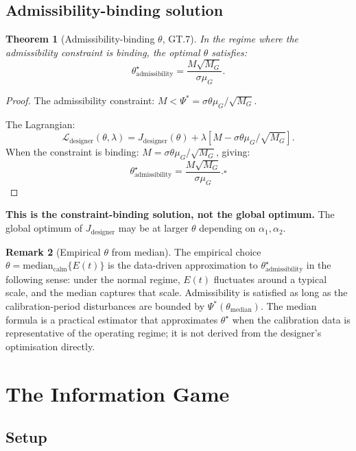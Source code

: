 \documentclass[11pt,a4paper]{article}
\newtheorem{theorem}{Theorem}[section]
\theoremstyle{definition}
\newtheorem{remark}[theorem]{Remark}
\begin{document}
\subsection{Admissibility-binding solution}

\begin{theorem}[Admissibility-binding $\theta$, GT.7]
\emph{In the regime where the admissibility constraint is binding}, the optimal $\theta$ satisfies:
\[
\theta^\star_\text{admissibility} = \frac{M\sqrt{M_G}}{\sigma\mu_G}.
\]
\end{theorem}

\begin{proof}
The admissibility constraint: $M < \Psi^* = \sigma\theta\mu_G/\sqrt{M_G}$.

The Lagrangian:
\[
\mathcal{L}_\text{designer}(\theta,\lambda) = J_\text{designer}(\theta) + \lambda[M - \sigma\theta\mu_G/\sqrt{M_G}].
\]
When the constraint is binding: $M = \sigma\theta\mu_G/\sqrt{M_G}$, giving:
\[
\theta^\star_\text{admissibility} = \frac{M\sqrt{M_G}}{\sigma\mu_G}. \square
\]
\end{proof}

\textbf{This is the constraint-binding solution, not the global optimum.}
The global optimum of $J_\text{designer}$ may be at larger $\theta$ depending on $\alpha_1, \alpha_2$.

\begin{remark}[Empirical $\theta$ from median]
The empirical choice $\theta = \mathrm{median}_\text{calm}\{E(t)\}$ is the data-driven approximation
to $\theta^\star_\text{admissibility}$ in the following sense: under the normal regime, $E(t)$ fluctuates
around a typical scale, and the median captures that scale. Admissibility is satisfied as long as
the calibration-period disturbances are bounded by $\Psi^*(\theta_\text{median})$.
The median formula is a practical estimator that approximates $\theta^\star$ when the calibration data
is representative of the operating regime; it is not derived from the designer's optimisation directly.
\end{remark}

\section{The Information Game}

\subsection{Setup}
\end{document}

